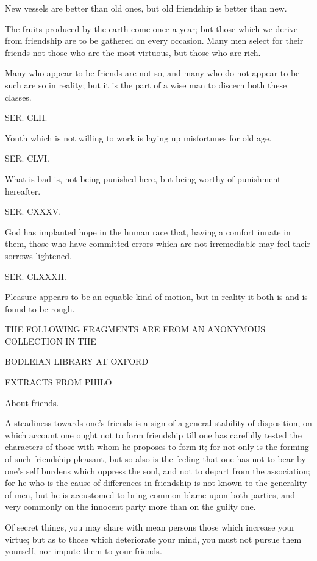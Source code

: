 New vessels are better than old ones, but old friendship is better than new.

The fruits produced by the earth come once a year; but those which we derive from friendship are
to be gathered on every occasion. Many men select for their friends not those who are the most
virtuous, but those who are rich.

Many who appear to be friends are not so, and many who do not appear to be such are so in
reality; but it is the part of a wise man to discern both these classes.

SER. CLII.

Youth which is not willing to work is laying up misfortunes for old age.

SER. CLVI.

What is bad is, not being punished here, but being worthy of punishment hereafter.

SER. CXXXV.

God has implanted hope in the human race that, having a comfort innate in them, those who have
committed errors which are not irremediable may feel their sorrows lightened.

SER. CLXXXII.

Pleasure appears to be an equable kind of motion, but in reality it both is and is found to be rough.

THE FOLLOWING FRAGMENTS ARE FROM AN ANONYMOUS COLLECTION IN THE

BODLEIAN LIBRARY AT OXFORD

EXTRACTS FROM PHILO

About friends.

A steadiness towards one's friends is a sign of a general stability of disposition, on which account one
ought not to form friendship till one has carefully tested the characters of those with whom he proposes
to form it; for not only is the forming of such friendship pleasant, but so also is the feeling that one has
not to bear by one's self burdens which oppress the soul, and not to depart from the association; for he
who is the cause of differences in friendship is not known to the generality of men, but he is accustomed
to bring common blame upon both parties, and very commonly on the innocent party more than on the
guilty one.

Of secret things, you may share with mean persons those which increase your virtue; but as to those
which deteriorate your mind, you must not pursue them yourself, nor impute them to your friends.


